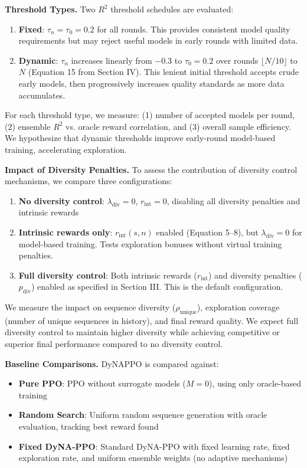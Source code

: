 \textbf{Threshold Types.} Two $R^2$ threshold schedules are evaluated:
\begin{enumerate}
    \item \textbf{Fixed}: $\tau_n = \tau_0 = 0.2$ for all rounds. This provides consistent model quality requirements but may reject useful models in early rounds with limited data.

    \item \textbf{Dynamic}: $\tau_n$ increases linearly from $-0.3$ to $\tau_0 = 0.2$ over rounds $\lfloor N/10 \rfloor$ to $N$ (Equation 15 from Section IV). This lenient initial threshold accepts crude early models, then progressively increases quality standards as more data accumulates.
\end{enumerate}

For each threshold type, we measure: (1) number of accepted models per round, (2) ensemble $R^2$ vs. oracle reward correlation, and (3) overall sample efficiency. We hypothesize that dynamic thresholds improve early-round model-based training, accelerating exploration.

\textbf{Impact of Diversity Penalties.} To assess the contribution of diversity control mechanisms, we compare three configurations:
\begin{enumerate}
    \item \textbf{No diversity control}: $\lambda_{\text{div}} = 0$, $r_{\text{int}} = 0$, disabling all diversity penalties and intrinsic rewards

    \item \textbf{Intrinsic rewards only}: $r_{\text{int}}(s,n)$ enabled (Equation 5--8), but $\lambda_{\text{div}} = 0$ for model-based training. Tests exploration bonuses without virtual training penalties.

    \item \textbf{Full diversity control}: Both intrinsic rewards ($r_{\text{int}}$) and diversity penalties ($p_{\text{div}}$) enabled as specified in Section III. This is the default configuration.
\end{enumerate}

We measure the impact on sequence diversity ($\rho_{\text{unique}}$), exploration coverage (number of unique sequences in history), and final reward quality. We expect full diversity control to maintain higher diversity while achieving competitive or superior final performance compared to no diversity control.

\textbf{Baseline Comparisons.} DyNAPPO is compared against:
\begin{itemize}
    \item \textbf{Pure PPO}: PPO without surrogate models ($M = 0$), using only oracle-based training
    \item \textbf{Random Search}: Uniform random sequence generation with oracle evaluation, tracking best reward found
    \item \textbf{Fixed DyNA-PPO}: Standard DyNA-PPO with fixed learning rate, fixed exploration rate, and uniform ensemble weights (no adaptive mechanisms)
\end{itemize}

